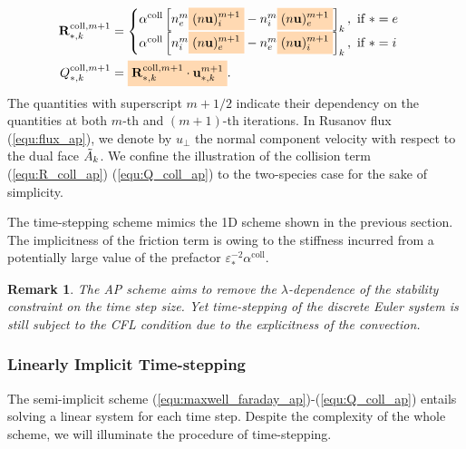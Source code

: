\documentclass{article}
\newtheorem*{remark}{Remark}
\newcommand{\mycolorbox}[2]{\colorbox{#1}{$\displaystyle#2$}}
\begin{document}
\begin{subequations}
\begin{align}
    \mathbf{R}_{*,k}^{\text{coll},m+1} &= 
    \begin{cases}
    \alpha^\text{coll}\left[n_{e}^m\mycolorbox{orange!30}{(n\mathbf{u})^{m+1}_{i}} - n_{i}^m\mycolorbox{orange!30}{(n\mathbf{u})^{m+1}_{e}}\right]_k, \text{   if   } * = e \\
    \alpha^\text{coll}\left[n_{i}^m\mycolorbox{orange!30}{(n\mathbf{u})^{m+1}_{e}} - n_{e}^m\mycolorbox{orange!30}{(n\mathbf{u})^{m+1}_{i}}\right]_k, \text{   if   } * = i
    \end{cases}  \label{equ:R_coll_ap}\\
    Q_{*,k}^{\text{coll},m+1} &= \mycolorbox{orange!30}{\mathbf{R}_{*,k}^{\text{coll},m+1} \cdot \mathbf{u}_{\ast,k}^{m+1}} \label{equ:Q_coll_ap}
.\end{align}
\end{subequations}
The quantities with superscript $m+1/2$ indicate their dependency on the quantities at both $m$-th and $(m+1)$-th iterations. In Rusanov flux (\ref{equ:flux_ap}), we denote by $u_\perp$ the normal component velocity with respect to the dual face $\Tilde{A}_k$. We confine the illustration of the collision term (\ref{equ:R_coll_ap}) (\ref{equ:Q_coll_ap}) to the two-species case for the sake of simplicity. 

The time-stepping scheme mimics the 1D scheme shown in the previous section. The implicitness of the friction term is owing to the stiffness incurred from a potentially large value of the prefactor $\varepsilon^{-2}_*\alpha^\text{coll}$.

\begin{remark}
    The AP scheme aims to remove the $\lambda$-dependence of the stability constraint on the time step size. Yet time-stepping of the discrete Euler system is still subject to the CFL condition due to the explicitness of the convection.   
\end{remark}

\subsubsection{Linearly Implicit Time-stepping}
The semi-implicit scheme (\ref{equ:maxwell_faraday_ap})-(\ref{equ:Q_coll_ap}) entails solving a linear system for each time step. Despite the complexity of the whole scheme, we will illuminate the procedure of time-stepping.
\end{document}
